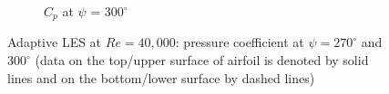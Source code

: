 \begin{figure}[H]
\begin{subfigure}[b]{0.475\textwidth}
\caption{ $C_p$ at $\psi$ = $300^\circ$}
\label{fig:zonal_Cp_300}
\end{subfigure}
\caption{Adaptive LES at $Re=40,000$: pressure coefficient at $\psi=270^\circ$ and $300^\circ$ (data on the top/upper surface of airfoil is denoted by solid lines and on the bottom/lower surface by dashed lines)}
\label{fig:zonal_Cp_plots_TEV}
\end{figure}

